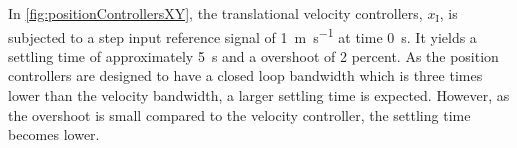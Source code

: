 \begin{minipage}{\linewidth}
\begin{minipage}{0.46\linewidth}
\begin{figure}[H]
            \centering
            \label{fig:velocityControllersXYAction}
        \end{figure}
    \end{minipage}
\end{minipage}

In \autoref{fig:positionControllersXY}, the translational velocity controllers, $x_{\mathrm{I}}$, is subjected to a step input reference signal of \SI{1}{m s^{-1}} at time \SI{0}{s}. It yields a settling time of approximately \SI{5}{s} and a overshoot of 2 percent. As the position controllers are designed to have a closed loop bandwidth which is three times lower than the velocity bandwidth, a larger settling time is expected. However, as the overshoot is small compared to the velocity controller, the settling time becomes lower.%

